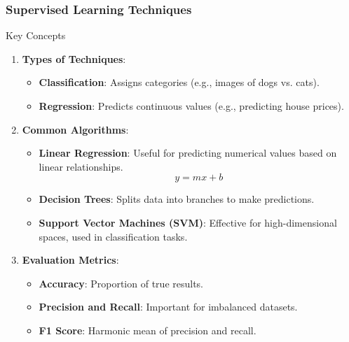 \documentclass[aspectratio=169]{beamer}
\begin{document}
\begin{frame}[fragile]
    \frametitle{Supervised Learning Techniques}
    
    \begin{block}{Key Concepts}
        \begin{enumerate}
            \item \textbf{Types of Techniques}:
                \begin{itemize}
                    \item \textbf{Classification}: Assigns categories (e.g., images of dogs vs. cats).
                    \item \textbf{Regression}: Predicts continuous values (e.g., predicting house prices).
                \end{itemize}
            
            \item \textbf{Common Algorithms}:
                \begin{itemize}
                    \item \textbf{Linear Regression}: Useful for predicting numerical values based on linear relationships. 
                      \begin{equation}
                          y = mx + b
                      \end{equation}
                    \item \textbf{Decision Trees}: Splits data into branches to make predictions.
                    \item \textbf{Support Vector Machines (SVM)}: Effective for high-dimensional spaces, used in classification tasks.
                \end{itemize}
            
            \item \textbf{Evaluation Metrics}:
                \begin{itemize}
                    \item \textbf{Accuracy}: Proportion of true results.
                    \item \textbf{Precision and Recall}: Important for imbalanced datasets.
                    \item \textbf{F1 Score}: Harmonic mean of precision and recall.
                \end{itemize}
        \end{enumerate}
    \end{block}
\end{frame}
\end{document}
